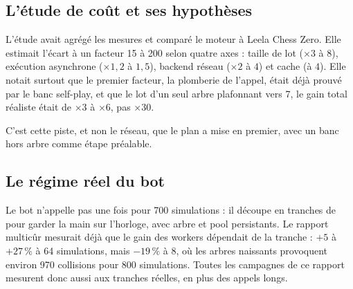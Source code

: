 \subsection{L'\'etude de co\^ut et ses hypoth\`eses}

L'\'etude  avait agr\'eg\'e les mesures
et compar\'e le moteur \`a Leela Chess Zero. Elle estimait l'\'ecart \`a un
facteur 15 \`a 200 selon quatre axes : taille de lot ($\times 3$ \`a $8$),
ex\'ecution asynchrone ($\times 1{,}2$ \`a $1{,}5$), backend r\'eseau
($\times 2$ \`a $4$) et cache (\`a $4$). Elle notait surtout que le premier
facteur, la plomberie de l'appel, \'etait d\'ej\`a prouv\'e par le banc
self-play, et que le lot d'un seul arbre plafonnant vers 7, le gain total
r\'ealiste \'etait de $\times 3$ \`a $\times 6$, pas $\times 30$.

C'est cette piste, et non le r\'eseau, que le plan
 a mise en premier, avec un banc
hors arbre comme \'etape pr\'ealable.

\subsection{Le r\'egime r\'eel du bot}

Le bot n'appelle pas  une fois pour 700 simulations : il
d\'ecoupe en tranches de  pour garder la main sur
l'horloge, avec arbre et pool persistants. Le rapport multic\^ur mesurait d\'ej\`a
que le gain des workers d\'ependait de la tranche : $+5$ \`a $+27\,\%$ \`a 64
simulations, mais $-19\,\%$ \`a 8, o\`u les arbres naissants provoquent environ
970 collisions pour 800 simulations. Toutes les campagnes de ce rapport
mesurent donc aussi aux tranches r\'eelles, en plus des appels longs.

